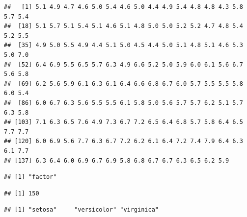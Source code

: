 \documentclass[]{article}
\newenvironment{Shaded}{\begin{snugshade}}{\end{snugshade}}
\newcommand{\CommentTok}[1]{\textcolor[rgb]{0.56,0.35,0.01}{\textit{#1}}}
\newcommand{\KeywordTok}[1]{\textcolor[rgb]{0.13,0.29,0.53}{\textbf{#1}}}
\newcommand{\NormalTok}[1]{#1}
\newcommand{\OperatorTok}[1]{\textcolor[rgb]{0.81,0.36,0.00}{\textbf{#1}}}
\begin{document}
\begin{verbatim}
##   [1] 5.1 4.9 4.7 4.6 5.0 5.4 4.6 5.0 4.4 4.9 5.4 4.8 4.8 4.3 5.8 5.7 5.4
##  [18] 5.1 5.7 5.1 5.4 5.1 4.6 5.1 4.8 5.0 5.0 5.2 5.2 4.7 4.8 5.4 5.2 5.5
##  [35] 4.9 5.0 5.5 4.9 4.4 5.1 5.0 4.5 4.4 5.0 5.1 4.8 5.1 4.6 5.3 5.0 7.0
##  [52] 6.4 6.9 5.5 6.5 5.7 6.3 4.9 6.6 5.2 5.0 5.9 6.0 6.1 5.6 6.7 5.6 5.8
##  [69] 6.2 5.6 5.9 6.1 6.3 6.1 6.4 6.6 6.8 6.7 6.0 5.7 5.5 5.5 5.8 6.0 5.4
##  [86] 6.0 6.7 6.3 5.6 5.5 5.5 6.1 5.8 5.0 5.6 5.7 5.7 6.2 5.1 5.7 6.3 5.8
## [103] 7.1 6.3 6.5 7.6 4.9 7.3 6.7 7.2 6.5 6.4 6.8 5.7 5.8 6.4 6.5 7.7 7.7
## [120] 6.0 6.9 5.6 7.7 6.3 6.7 7.2 6.2 6.1 6.4 7.2 7.4 7.9 6.4 6.3 6.1 7.7
## [137] 6.3 6.4 6.0 6.9 6.7 6.9 5.8 6.8 6.7 6.7 6.3 6.5 6.2 5.9
\end{verbatim}

\begin{Shaded}
\end{Shaded}

\begin{verbatim}
## [1] "factor"
\end{verbatim}

\begin{Shaded}
\end{Shaded}

\begin{verbatim}
## [1] 150
\end{verbatim}

\begin{Shaded}
\end{Shaded}

\begin{verbatim}
## [1] "setosa"     "versicolor" "virginica"
\end{verbatim}

\begin{Shaded}
\end{Shaded}
\end{document}
